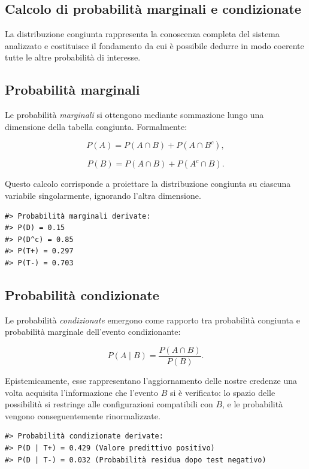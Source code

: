 \documentclass[
  letterpaper,
  DIV=11,
  numbers=noendperiod,
  oneside]{scrreprt}
\theoremstyle{definition}
\theoremstyle{plain}
\theoremstyle{definition}
\theoremstyle{remark}
\begin{document}
\subsection{Calcolo di probabilità marginali e
condizionate}\label{calcolo-di-probabilituxe0-marginali-e-condizionate}

La distribuzione congiunta rappresenta la conoscenza completa del
sistema analizzato e costituisce il fondamento da cui è possibile
dedurre in modo coerente tutte le altre probabilità di interesse.

\subsection{Probabilità marginali}\label{probabilituxe0-marginali}

Le probabilità \emph{marginali} si ottengono mediante sommazione lungo
una dimensione della tabella congiunta. Formalmente:

\[
P(A) = P(A \cap B) + P(A \cap B^c),
\]

\[
P(B) = P(A \cap B) + P(A^c \cap B).
\]

Questo calcolo corrisponde a proiettare la distribuzione congiunta su
ciascuna variabile singolarmente, ignorando l'altra dimensione.

\begin{verbatim}
#> Probabilità marginali derivate:
#> P(D) = 0.15
#> P(D^c) = 0.85
#> P(T+) = 0.297
#> P(T-) = 0.703
\end{verbatim}

\subsection{Probabilità condizionate}\label{probabilituxe0-condizionate}

Le probabilità \emph{condizionate} emergono come rapporto tra
probabilità congiunta e probabilità marginale dell'evento condizionante:

\[
P(A \mid B) = \frac{P(A \cap B)}{P(B)}.
\]

Epistemicamente, esse rappresentano l'aggiornamento delle nostre
credenze una volta acquisita l'informazione che l'evento \(B\) si è
verificato: lo spazio delle possibilità si restringe alle configurazioni
compatibili con \(B\), e le probabilità vengono conseguentemente
rinormalizzate.

\begin{verbatim}
#> Probabilità condizionate derivate:
#> P(D | T+) = 0.429 (Valore predittivo positivo)
#> P(D | T-) = 0.032 (Probabilità residua dopo test negativo)
\end{verbatim}
\end{document}
